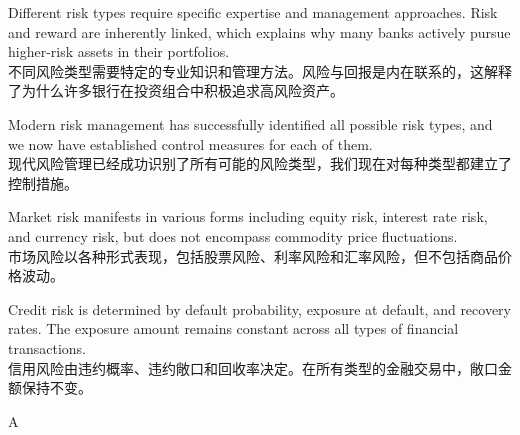 \documentclass{article}
\begin{document}
    \begin{choices}
        \item Different risk types require specific expertise and management approaches. Risk and reward are inherently linked, which explains why many banks actively pursue higher-risk assets in their portfolios. \\
        不同风险类型需要特定的专业知识和管理方法。风险与回报是内在联系的，这解释了为什么许多银行在投资组合中积极追求高风险资产。
        
        \item Modern risk management has successfully identified all possible risk types, and we now have established control measures for each of them. \\
        现代风险管理已经成功识别了所有可能的风险类型，我们现在对每种类型都建立了控制措施。
        
        \item Market risk manifests in various forms including equity risk, interest rate risk, and currency risk, but does not encompass commodity price fluctuations. \\
        市场风险以各种形式表现，包括股票风险、利率风险和汇率风险，但不包括商品价格波动。
        
        \item Credit risk is determined by default probability, exposure at default, and recovery rates. The exposure amount remains constant across all types of financial transactions. \\
        信用风险由违约概率、违约敞口和回收率决定。在所有类型的金融交易中，敞口金额保持不变。
    \end{choices}
    
    \begin{correctanswer}
    A
    \end{correctanswer}
    
\end{document}
